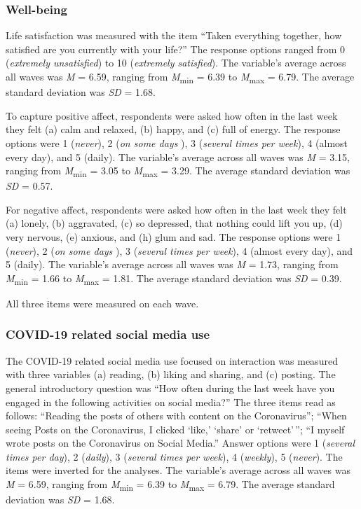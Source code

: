 \documentclass[
  english,
  man,mask,floatsintext]{apa6}
\begin{document}
\hypertarget{well-being}{%
\subsubsection{Well-being}\label{well-being}}

Life satisfaction was measured with the item ``Taken everything together, how satisfied are you currently with your life?''
The response options ranged from 0 (\emph{extremely unsatisfied}) to 10 (\emph{extremely satisfied}).
The variable's average across all waves was \emph{M} = 6.59, ranging from \emph{M}\textsubscript{min} = 6.39 to \emph{M}\textsubscript{max} = 6.79.
The average standard deviation was \emph{SD} = 1.68.

To capture positive affect, respondents were asked how often in the last week they felt (a) calm and relaxed, (b) happy, and (c) full of energy.
The response options were 1 (\emph{never}), 2 (\emph{on some days} ), 3 (\emph{several times per week}), 4 (almost every day), and 5 (daily).
The variable's average across all waves was \emph{M} = 3.15, ranging from \emph{M}\textsubscript{min} = 3.05 to \emph{M}\textsubscript{max} = 3.29.
The average standard deviation was \emph{SD} = 0.57.

For negative affect, respondents were asked how often in the last week they felt (a) lonely, (b) aggravated, (c) so depressed, that nothing could lift you up, (d) very nervous, (e) anxious, and (h) glum and sad.
The response options were 1 (\emph{never}), 2 (\emph{on some days} ), 3 (\emph{several times per week}), 4 (almost every day), and 5 (daily).
The variable's average across all waves was \emph{M} = 1.73, ranging from \emph{M}\textsubscript{min} = 1.66 to \emph{M}\textsubscript{max} = 1.81.
The average standard deviation was \emph{SD} = 0.39.

All three items were measured on each wave.

\hypertarget{covid-19-related-social-media-use}{%
\subsubsection{COVID-19 related social media use}\label{covid-19-related-social-media-use}}

The COVID-19 related social media use focused on interaction was measured with three variables (a) reading, (b) liking and sharing, and (c) posting.
The general introductory question was ``How often during the last week have you engaged in the following activities on social media?''
The three items read as follows:
``Reading the posts of others with content on the Coronavirus''; ``When seeing Posts on the Coronavirus, I clicked `like,' `share' or `retweet'\,''; ``I myself wrote posts on the Coronavirus on Social Media.''
Answer options were 1 (\emph{several times per day}), 2 (\emph{daily}), 3 (\emph{several times per week}), 4 (\emph{weekly}), 5 (\emph{never}).
The items were inverted for the analyses.
The variable's average across all waves was \emph{M} = 6.59, ranging from \emph{M}\textsubscript{min} = 6.39 to \emph{M}\textsubscript{max} = 6.79.
The average standard deviation was \emph{SD} = 1.68.
\end{document}

